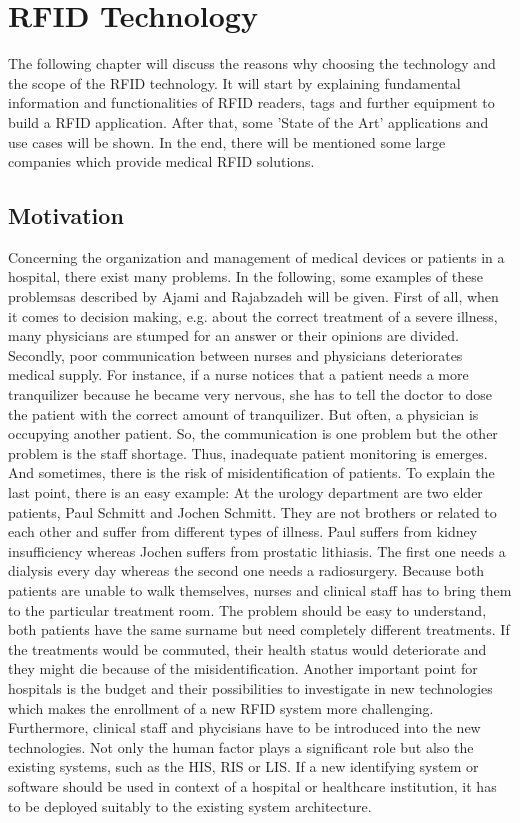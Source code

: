 
\chapter{RFID Technology}

The following chapter will discuss the reasons why choosing the technology and the scope of the RFID technology. It will start by explaining fundamental information and functionalities of RFID readers, tags and further equipment to build a RFID application. After that, some 'State of the Art' applications and use cases will be shown. In the end, there will be mentioned some large companies which provide medical RFID solutions.

\section{Motivation}

Concerning the organization and management of medical devices or patients in a hospital, there exist many problems. In the following, some examples of these problemsas described by Ajami and Rajabzadeh  \cite{ncbi} will be given.
First of all, when it comes to decision making, e.g. about the correct treatment of a severe illness, many physicians are stumped for an answer or their opinions are divided. 
Secondly, poor communication between nurses and physicians deteriorates medical supply. For instance, if a nurse notices that a patient needs a more tranquilizer because he became very nervous, she has to tell the doctor to dose the patient with the correct amount of tranquilizer. But often, a physician is occupying another patient. So, the communication is one problem but the other problem is the staff shortage. Thus, inadequate patient monitoring is emerges. And sometimes, there is the risk of misidentification of patients. To explain the last point, there is an easy example: At the urology department are two elder patients, Paul Schmitt and Jochen Schmitt. They are not brothers or related to each other and suffer from different types of illness. Paul suffers from kidney insufficiency whereas Jochen suffers from prostatic lithiasis. The first one needs a dialysis every day whereas the second one needs a radiosurgery. Because both patients are unable to walk themselves, nurses and clinical staff has to bring them to the particular treatment room. The problem should be easy to understand, both patients have the same surname but need completely different treatments. If the treatments would be commuted, their health status would deteriorate and they might die because of the misidentification.
Another important point for hospitals is the budget and their possibilities to investigate in new technologies which makes the enrollment of a new RFID system more challenging. Furthermore, clinical staff and phycisians have to be introduced into the new technologies. Not only the human factor plays a significant role but also the existing systems, such as the \ac{HIS}, \ac{RIS} or \ac{LIS}. If a new identifying system or software should be used in context of a hospital or healthcare institution, it has to be deployed suitably to the existing system architecture. 





